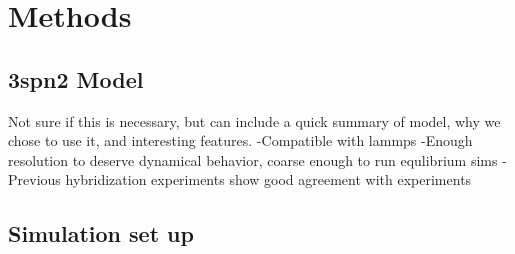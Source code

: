 \documentclass[journal=jpcbfk,manuscript=article]{achemso}
\begin{document}
\section{\label{sec:methods}Methods}

\subsection{\label{sec:methods}3spn2 Model}
Not sure if this is necessary, but can include a quick summary of model, why we chose to use it, and interesting features.
-Compatible with lammps
-Enough resolution to deserve dynamical behavior, coarse enough to run equlibrium sims
-Previous hybridization experiments show good agreement with experiments

\subsection{\label{sec:methods}Simulation set up}
\end{document}
